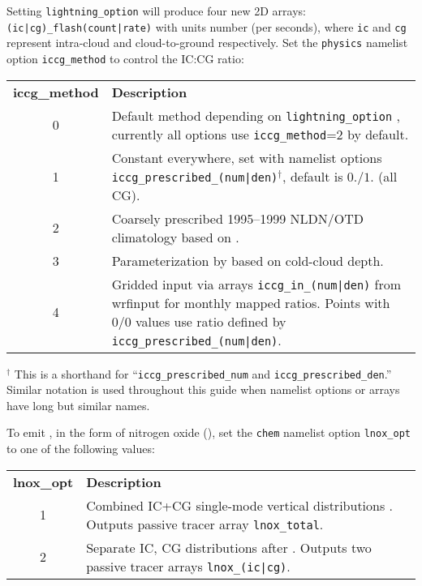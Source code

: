 \noindent Setting {\tt lightning\_option} will produce four new 2D arrays: {\tt (ic|cg)\_flash(count|rate)} with units number (per seconds), where {\tt ic} and {\tt cg} represent intra-cloud and cloud-to-ground respectively. Set the {\tt physics} namelist option {\tt iccg\_method} to control the IC:CG ratio:
\begin{center}
\begin{tabular}{cp{4.5in}}
	{\bf iccg\_method} & {\bf Description} \\
	0 & Default method depending on {\tt lightning\_option} , currently all options use {\tt iccg\_method}=2 by default. \\
	1 & Constant everywhere, set with namelist options {\tt iccg\_prescribed\_(num|den)}$^\dagger$, default is $0./1.$ (all CG). \\
	2 & Coarsely prescribed 1995--1999 NLDN/OTD climatology based on \citet{Boccippio:2001ys}. \\
	3 & Parameterization by \citet{Price:1993fk} based on cold-cloud depth. \\
	4 & Gridded input via arrays {\tt iccg\_in\_(num|den)} from wrfinput for monthly mapped ratios. Points with 0/0 values use ratio defined by {\tt iccg\_prescribed\_(num|den)}.
\end{tabular}
\end{center}
{\footnotesize
$^\dagger$ This is a shorthand for ``{\tt iccg\_prescribed\_num} and {\tt iccg\_prescribed\_den}.'' Similar notation is used throughout this guide when namelist options or arrays have long but similar names.
}
\vspace{.4in}

\noindent To emit , in the form of nitrogen oxide (), set the {\tt chem} namelist option {\tt lnox\_opt} to one of the following values:
\begin{center}
\begin{tabular}{cp{4.5in}}
	{\bf lnox\_opt} & {\bf Description} \\
	1	& Combined IC+CG single-mode vertical distributions \citep{Ott:2010lo}. Outputs passive tracer array {\tt lnox\_total}. \\
	2	& Separate IC, CG distributions after \citet{Decaria:2000kl}. Outputs two passive tracer arrays {\tt lnox\_(ic|cg)}.
\end{tabular}
\end{center}
\vspace{.4in}

